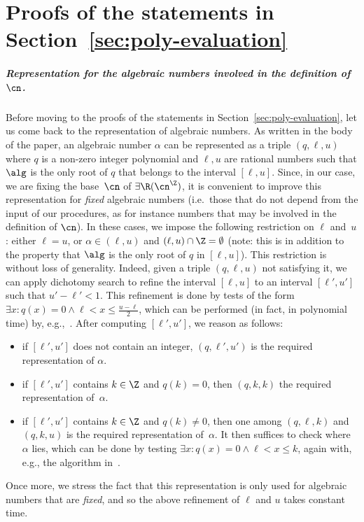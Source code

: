 \section{Proofs of the statements in Section~\ref{sec:poly-evaluation}}
\label{appendix:sec-poly-evaluation}

\subparagraph*{Representation for the algebraic numbers involved in the definition of $\cn$.}
Before moving to the proofs of the statements in
Section~\ref{sec:poly-evaluation}, let us come back to the representation of
algebraic numbers. As written in the body of the paper, an algebraic number
$\alpha$ can be represented as a triple $(q,\ell,u)$ where $q$ is a non-zero
integer polynomial and $\ell,u$ are rational numbers such that $\alg$ is the
only root of $q$ that belongs to the interval $[\ell,u]$. Since, in our case, we
are fixing the base~$\cn$ of $\exists\R(\ipow{\cn})$, it is convenient to
improve this representation for \emph{fixed} algebraic numbers (i.e.~those that
do not depend from the input of our procedures, as for instance numbers that may
be involved in the definition of $\cn$). In these cases, we impose the following
restriction on $\ell$ and~$u$: either $\ell = u$, or $\alpha \in
(\ell,u)$ and $(\ell,u) \cap \Z = \emptyset$ (note: this is in addition to the
property that $\alg$ is the only root of $q$ in $[\ell,u]$). This restriction is
without loss of generality. Indeed, given a triple $(q,\ell,u)$ not satisfying
it, we can apply dichotomy search to refine the interval $[\ell,u]$ to an
interval $[\ell',u']$ such that $u'-\ell' < 1$. This refinement is done by tests
of the form $\exists x : q(x) = 0 \land \ell < x \leq \frac{u-\ell}{2}$, which
can be performed (in fact, in polynomial time) by, e.g.,~.
After computing $[\ell',u']$, we reason as follows: 
\begin{itemize}
  \item if $[\ell',u']$ does not contain an integer, $(q,\ell',u')$ is the
  required representation of $\alpha$.
  \item if $[\ell',u']$ contains $k \in \Z$ and $q(k) = 0$, then $(q,k,k)$ the
  required representation of~$\alpha$.
  \item if $[\ell',u']$ contains $k \in \Z$ and $q(k) \neq 0$, then one among
  $(q,\ell,k)$ and $(q,k,u)$ is the required representation of~$\alpha$. It then
  suffices to check where $\alpha$ lies, which can be done by testing $\exists x
  : q(x) = 0 \land \ell < x \leq k$, again with, e.g., the algorithm
  in~.
\end{itemize}
Once more, we stress the fact that this representation is only used for algebraic numbers that are \emph{fixed}, and so the above refinement of $\ell$ and $u$ takes constant time.

